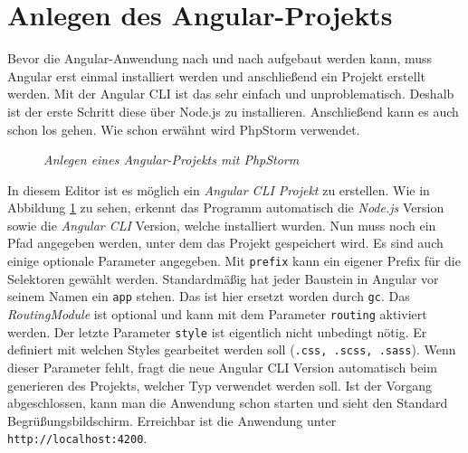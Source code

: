\section{Anlegen des Angular-Projekts}
\label{sec:umsetzung}
%
Bevor die Angular-Anwendung nach und nach aufgebaut werden kann, muss Angular erst einmal installiert werden und anschließend ein Projekt erstellt werden. Mit der Angular CLI ist das sehr einfach und unproblematisch. Deshalb ist der erste Schritt diese über Node.js zu installieren. Anschließend kann es auch schon los gehen. Wie schon erwähnt wird PhpStorm verwendet. 
%
\begin{figure}[h]
	\centering
	{}
	\caption[Anlegen eines Projekts]{\textit{Anlegen eines Angular-Projekts mit PhpStorm}}
	\label{fig:createproject}
\end{figure}
%
In diesem Editor ist es möglich ein \textit{Angular CLI Projekt} zu erstellen. Wie in Abbildung \ref{fig:createproject} zu sehen, erkennt das Programm automatisch die \textit{Node.js} Version sowie die \textit{Angular CLI} Version, welche installiert wurden. Nun muss noch ein Pfad angegeben werden, unter dem das Projekt gespeichert wird. Es sind auch einige optionale Parameter angegeben. Mit \texttt{prefix} kann ein eigener Prefix für die Selektoren gewählt werden. Standardmäßig hat jeder Baustein in Angular vor seinem Namen ein \texttt{app} stehen. Das ist hier ersetzt worden durch \texttt{gc}. Das \textit{RoutingModule} ist optional und kann mit dem Parameter \texttt{routing} aktiviert werden. Der letzte Parameter \texttt{style} ist eigentlich nicht unbedingt nötig. Er definiert mit welchen Styles gearbeitet werden soll (\texttt{.css, .scss, .sass}). Wenn dieser Parameter fehlt, fragt die neue Angular CLI Version automatisch beim generieren des Projekts, welcher Typ verwendet werden soll. Ist der Vorgang abgeschlossen, kann man die Anwendung schon starten und sieht den Standard Begrüßungsbildschirm. Erreichbar ist die Anwendung unter \texttt{http://localhost:4200}.
%
